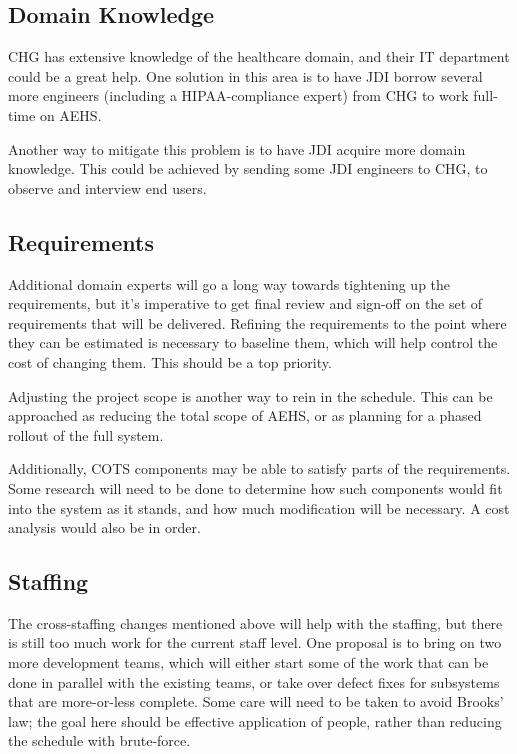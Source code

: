 \documentclass[12pt]{article}
\begin{document}
\subsection{Domain Knowledge}
CHG has extensive knowledge of the healthcare domain, and their IT department could be a great help.
One solution in this area is to have JDI borrow several more engineers (including a HIPAA-compliance
expert) from CHG to work full-time on AEHS.

Another way to mitigate this problem is to have JDI acquire more domain knowledge.  This could be
achieved by sending some JDI engineers to CHG, to observe and interview end users.
\todo{}


\subsection{Requirements}
Additional domain experts will go a long way towards tightening up the requirements, but it's
imperative to get final review and sign-off on the set of requirements that will be delivered.
Refining the requirements to the point where they can be estimated is necessary to baseline them,
which will help control the cost of changing them.  This should be a top priority.

Adjusting the project scope is another way to rein in the schedule.  This can be approached as
reducing the total scope of AEHS, or as planning for a phased rollout of the full system.  

Additionally, COTS components may be able to satisfy parts of the requirements.  Some research will
need to be done to determine how such components would fit into the system as it stands, and how
much modification will be necessary.  A cost analysis would also be in order.

\subsection{Staffing}
The cross-staffing changes mentioned above will help with the staffing, but there is still too much
work for the current staff level.  One proposal is to bring on two more development teams, which
will either start some of the work that can be done in parallel with the existing teams, or take
over defect fixes for subsystems that are more-or-less complete.  Some care will need to be taken to
avoid Brooks' law; the goal here should be effective application of people, rather than reducing the
schedule with brute-force.
\todo{}
\end{document}
